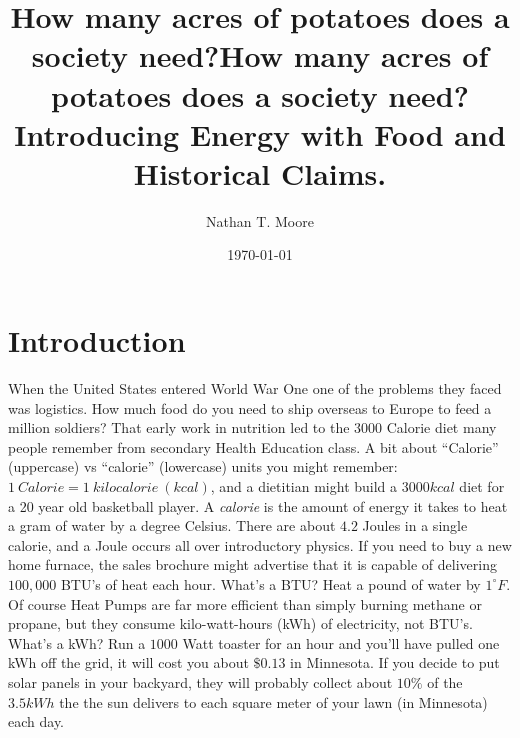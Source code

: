 \documentclass[jou]{apa7}
\begin{document}
\title{How many acres of potatoes does a society need?} 
\title{How many acres of potatoes does a society need? Introducing Energy with Food and Historical Claims.}
\author{Nathan T. Moore}
\date{\today}

\maketitle

\section{Introduction}
When the United States entered World War One one of the problems they faced was logistics.  How much food do you need to ship overseas to Europe to feed a million soldiers?  That early work in nutrition led to the $3000$ Calorie diet many people remember from secondary Health Education class.  A bit about ``Calorie'' (uppercase) vs ``calorie'' (lowercase) units you might remember: $1~Calorie = 1~kilocalorie~(kcal)$, and a dietitian might build a $3000 kcal$ diet for a 20 year old basketball player.  A \textit{calorie} is the amount of energy it takes  to heat a gram of water by a degree Celsius.  There are about $4.2$ Joules in a single calorie, and a Joule occurs all over introductory  physics.  If you need to buy a new home furnace, the sales brochure might advertise that it is capable of delivering $100,000$ BTU's of heat each hour.  What's a BTU? Heat a pound of water by $1^{\circ}F$.  Of course Heat Pumps are far more efficient than simply burning methane or propane, but they consume kilo-watt-hours (kWh) of electricity, not BTU's.  What's a kWh?  Run a $1000$ Watt toaster for an hour and you'll have pulled one kWh off the grid, it will cost you about $\$0.13$ in Minnesota.  If you decide to put solar panels in your backyard, they will probably collect about $10\%$ of the $3.5kWh$ the  the sun delivers to each square meter of your lawn (in Minnesota) each day.  
\end{document}
